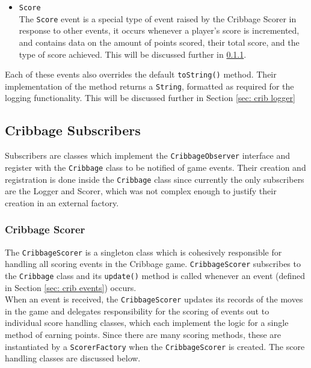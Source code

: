 \documentclass{article}
\begin{document}
\begin{itemize}
    \item \verb|Score|\\[2mm]
    The \verb|Score| event is a special type of event raised by the Cribbage Scorer in response to other events, it occurs whenever a player's score is incremented, and contains data on the amount of points scored, their total score, and the type of score achieved. This will be discussed further in \ref{sec: crib scorer}.
\end{itemize}
Each of these events also overrides the default \verb|toString()| method. Their implementation of the method returns a \verb|String|, formatted as required for the logging functionality. This will be discussed further in Section \ref{sec: crib logger}


\subsection{Cribbage Subscribers}
\label{sec: crib subscribers}
Subscribers are classes which implement the \verb|CribbageObserver| interface and register with the \verb|Cribbage| class to be notified of game events. Their creation and registration is done inside the \verb|Cribbage| class since currently the only subscribers are the Logger and Scorer, which was not complex enough to justify their creation in an external factory.
\subsubsection{Cribbage Scorer}
\label{sec: crib scorer}
The \verb|CribbageScorer| is a singleton class which is cohesively responsible for handling all scoring events in the Cribbage game. \verb|CribbageScorer| subscribes to the \verb|Cribbage| class and its \verb|update()| method is called whenever an event (defined in Section \ref{sec: crib events}) occurs.\\[2mm]
When an event is received, the \verb|CribbageScorer| updates its records of the moves in the game and delegates responsibility for the scoring of events out to individual score handling classes, which each implement the logic for a single method of earning points. Since there are many scoring methods, these are instantiated by a \verb|ScorerFactory| when the \verb|CribbageScorer| is created. The score handling classes are discussed below.
\end{document}
